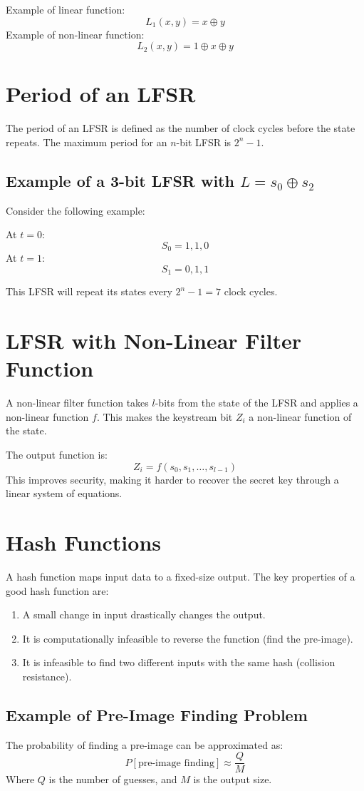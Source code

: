\documentclass{article}
\begin{document}
Example of linear function:
\[
L_1(x, y) = x \oplus y
\]
Example of non-linear function:
\[
L_2(x, y) = 1 \oplus x \oplus y
\]

\section{Period of an LFSR}
The period of an LFSR is defined as the number of clock cycles before the state repeats. The maximum period for an $n$-bit LFSR is $2^n - 1$.

\subsection{Example of a 3-bit LFSR with $L = s_0 \oplus s_2$}
Consider the following example:

At $t=0$:
\[
S_0 = 1, 1, 0
\]
At $t=1$:
\[
S_1 = 0, 1, 1
\]

This LFSR will repeat its states every $2^n - 1 = 7$ clock cycles.

\section{LFSR with Non-Linear Filter Function}
A non-linear filter function takes $l$-bits from the state of the LFSR and applies a non-linear function $f$. This makes the keystream bit $Z_i$ a non-linear function of the state.

The output function is:
\[
Z_i = f(s_0, s_1, \dots, s_{l-1})
\]
This improves security, making it harder to recover the secret key through a linear system of equations.

\section{Hash Functions}
A hash function maps input data to a fixed-size output. The key properties of a good hash function are:

\begin{enumerate}
    \item A small change in input drastically changes the output.
    \item It is computationally infeasible to reverse the function (find the pre-image).
    \item It is infeasible to find two different inputs with the same hash (collision resistance).
\end{enumerate}

\subsection{Example of Pre-Image Finding Problem}
The probability of finding a pre-image can be approximated as:
\[
P[\text{pre-image finding}] \approx \frac{Q}{M}
\]
Where $Q$ is the number of guesses, and $M$ is the output size.
\end{document}
